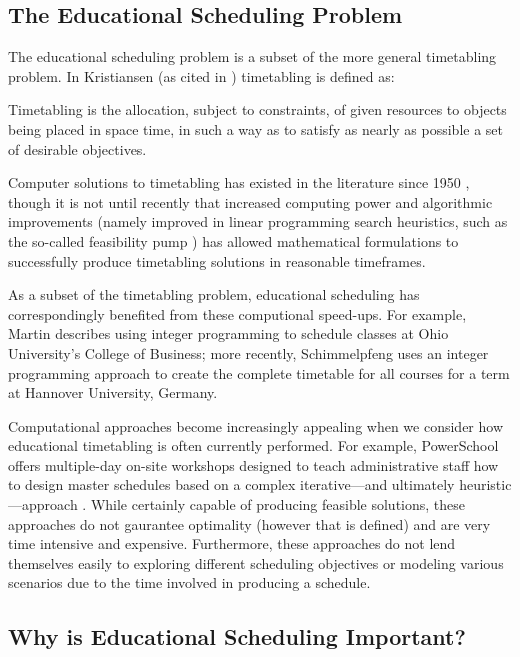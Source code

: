 \documentclass[12pt]{article}
\begin{document}
\subsection{The Educational Scheduling Problem}

The educational scheduling problem is a subset of the more general timetabling problem. In Kristiansen (as cited in \cite{wren1995scheduling}) timetabling is defined as:

\begin{displayquote}
Timetabling is the allocation, subject to constraints, of given resources to objects being placed in space time, in such a way as to satisfy as nearly as possible a set of desirable objectives. \cite{kristiansen2013comprehensive}
\end{displayquote}

Computer solutions to timetabling has existed in the literature since 1950 \cite{wren1995scheduling}, though it is not until recently that increased computing power and algorithmic improvements (namely improved in linear programming search heuristics, such as the so-called feasibility pump \cite{Fischetti2005}) has allowed mathematical formulations to successfully produce timetabling solutions in reasonable timeframes.

As a subset of the timetabling problem, educational scheduling has correspondingly benefited from these computional speed-ups. For example, Martin \cite{martin2004ohio} describes using integer programming to schedule classes at Ohio University’s College of Business; more recently, Schimmelpfeng \cite{schimmelpfeng2007application} uses an integer programming approach to create the complete timetable for all courses for a term at Hannover University, Germany.

Computational approaches become increasingly appealing when we consider how educational timetabling is often currently performed. For example, PowerSchool offers multiple-day on-site workshops designed to teach administrative staff how to design master schedules based on a complex iterative---and ultimately heuristic---approach \cite{powerSchool}. While certainly capable of producing feasible solutions, these approaches do not gaurantee optimality (however that is defined) and are very time intensive and expensive. Furthermore, these approaches do not lend themselves easily to exploring different scheduling objectives or modeling various scenarios due to the time involved in producing a schedule.

\subsection{Why is Educational Scheduling Important?}
\end{document}
